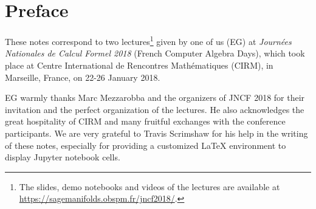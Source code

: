 \chapter*{Preface}
These notes correspond to two lectures\footnote{The slides, demo
notebooks and videos of the lectures are available at\\ \url{https://sagemanifolds.obspm.fr/jncf2018/}.} given by one of us (EG)
at \emph{Journées Nationales de Calcul Formel 2018}  (French Computer Algebra Days),
which took place at Centre International de Rencontres Mathématiques (CIRM),
in Marseille, France, on 22-26 January 2018.

EG warmly thanks Marc Mezzarobba and the organizers of JNCF 2018 for their
invitation and the perfect organization of the lectures. He also acknowledges
the great hospitality of CIRM and many fruitful exchanges with the conference
participants. We are very grateful to Travis Scrimshaw for his help in the
writing of these notes, especially for providing a customized \LaTeX{} environment
to display Jupyter notebook cells.
